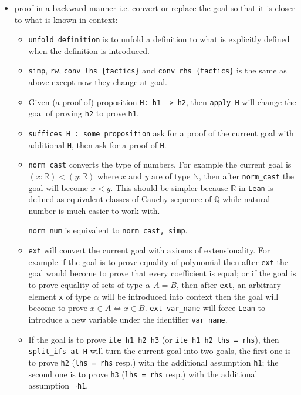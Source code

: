 \documentclass{report}
\theoremstyle{definition}
\begin{document}
\begin{itemize}
  \item proof in a backward manner i.e. convert or replace the goal so that it is closer to what is known in context:
  \begin{itemize}
    \item {\tt \small unfold definition} is to unfold a definition to what is explicitly defined when the definition is introduced.
    \item {\tt \small simp}, {\tt \small rw}, {\tt \small conv\_lhs \{tactics\}} and {\tt \small conv\_rhs \{tactics\}} is the same as above except now they change at goal.
    \item Given (a proof of) proposition {\tt \small H: h1 -> h2}, then {\tt \small apply H} will change the goal of proving {\tt \small h2} to prove {\tt \small h1}.
    \item {\tt \small suffices H : some\_proposition} ask for a proof of the current goal with additional {\tt \small H}, then ask for a proof of {\tt \small H}.
    \item {\tt \small norm\_cast} converts the type of numbers. For example the current goal is $(x:\mathbb R)<(y:\mathbb R)$ where $x$ and $y$ are of type $\mathbb N$, then after {\tt \small norm\_cast} the goal will become $x<y$. This should be simpler because $\mathbb R$ in {\tt \small Lean} is defined as equivalent classes of Cauchy sequence of $\mathbb Q$ while natural number is much easier to work with.
    
    {\tt \small norm\_num} is equivalent to {\tt \small norm\_cast, simp}.

    \item {\tt \small ext} will convert the current goal with axioms of extensionality. For example if the goal is to prove equality of polynomial then after {\tt \small ext} the goal would become to prove that every coefficient is equal; or if the goal is to prove equality of sets of type $\alpha$ $A=B$, then after {\tt \small ext}, an arbitrary element {\tt \small x} of type $\alpha$ will be introduced into context then the goal will become to prove $x\in A\iff x\in B$. {\tt \small ext var\_name} will force {\tt \small Lean} to introduce a new variable under the identifier {\tt \small var\_name}.
    \item If the goal is to prove {\tt \small ite h1 h2 h3} (or {\tt \small ite h1 h2 lhs = rhs}), then {\tt \small split\_ifs at H} will turn the current goal into two goals, the first one is to prove {\tt \small h2} ({\tt \small lhs = rhs} resp.) with the additional assumption {\tt \small h1}; the second one is to prove {\tt \small h3} ({\tt \small lhs = rhs} resp.) with the additional assumption {\tt \small $\neg$h1}.
  \end{itemize}


\end{itemize}
\end{document}
